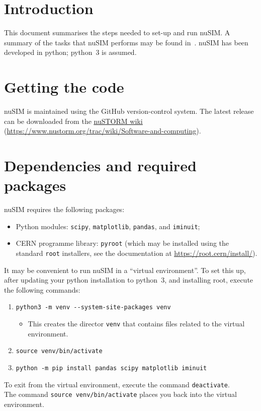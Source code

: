 \section*{Introduction}
This document summarises the steps needed to set-up and run nuSIM.
A summary of the tasks that nuSIM performs may be found
in~\cite{2021:nuSIM:Doc.01}.
nuSIM has been developed in python; python~3 is assumed.

\section*{Getting the code}
nuSIM is maintained using the GitHub version-control system.
The latest release can be downloaded from the
\href{https://www.nustorm.org}{\underline{\color{blue} nuSTORM wiki}}
(\href{https://www.nustorm.org/trac/wiki/Software-and-computing}{\underline{\color{blue}}https://www.nustorm.org/trac/wiki/Software-and-computing}).

\section*{Dependencies and required packages}
nuSIM requires the following packages:
\begin{itemize}
  \item Python modules: \verb+scipy+, \verb+matplotlib+, \verb+pandas+, and \verb+iminuit+;
  \item CERN programme library: \verb+pyroot+ (which may be installed
    using the standard \verb+root+ installers, see the documentation
    at \href{https://root.cern/install/}{\underline{\color{blue}https://root.cern/install/}}).
\end{itemize}
It may be convenient to run nuSIM in a ``virtual environment''.
To set this up, after updating your python installation to python~3,
and installing root, execute the following commands:
\begin{enumerate}
  \item \verb+python3 -m venv --system-site-packages venv+
    \begin{itemize}
      \item This creates the director \verb+venv+ that contains files
        related to the virtual environment.
    \end{itemize}
  \item \verb+source venv/bin/activate+
  \item \verb+python -m pip install pandas scipy matplotlib iminuit+
\end{enumerate}
To exit from the virtual environment, execute the command
\verb+deactivate+. \\
\noindent
The command \verb+source venv/bin/activate+ places you back
into the virtual environment.

